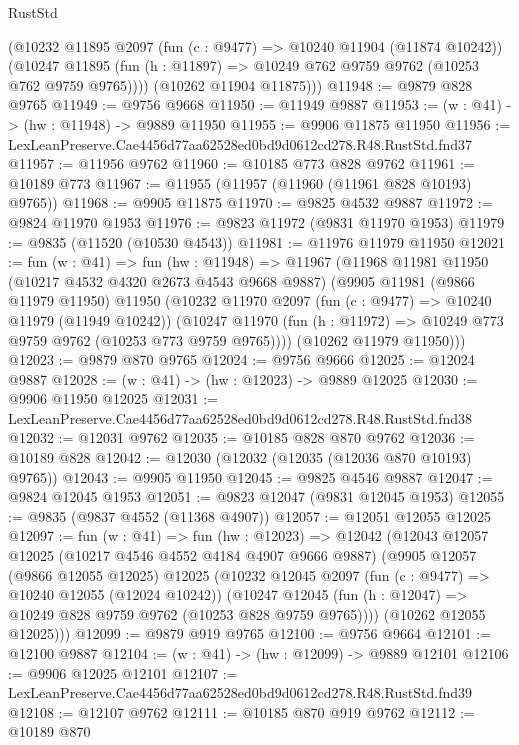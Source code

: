 \begin{lexlean}{RustStd}
\begin{coremodule}
        (@10232
          @11895
          @2097
          (fun (c : @9477) => @10240 @11904 (@11874 @10242))
          (@10247 @11895 (fun (h : @11897) => @10249 @762 @9759 @9762 (@10253 @762 @9759 @9765))))
        (@10262 @11904 @11875)))
@11948 := @9879 @828 @9765
@11949 := @9756 @9668
@11950 := @11949 @9887
@11953 := (w : @41) -> (hw : @11948) -> @9889 @11950
@11955 := @9906 @11875 @11950
@11956 := LexLeanPreserve.Cae4456d77aa62528ed0bd9d0612cd278.R48.RustStd.fnd37
@11957 := @11956 @9762
@11960 := @10185 @773 @828 @9762
@11961 := @10189 @773
@11967 := @11955 (@11957 (@11960 (@11961 @828 @10193) @9765))
@11968 := @9905 @11875
@11970 := @9825 @4532 @9887
@11972 := @9824 @11970 @1953
@11976 := @9823 @11972 (@9831 @11970 @1953)
@11979 := @9835 (@11520 (@10530 @4543))
@11981 := @11976 @11979 @11950
@12021 := fun (w : @41) =>
  fun (hw : @11948) =>
  @11967
    (@11968
      @11981
      @11950
      (@10217 @4532 @4320 @2673 @4543 @9668 @9887)
      (@9905
        @11981
        (@9866 @11979 @11950)
        @11950
        (@10232
          @11970
          @2097
          (fun (c : @9477) => @10240 @11979 (@11949 @10242))
          (@10247 @11970 (fun (h : @11972) => @10249 @773 @9759 @9762 (@10253 @773 @9759 @9765))))
        (@10262 @11979 @11950)))
@12023 := @9879 @870 @9765
@12024 := @9756 @9666
@12025 := @12024 @9887
@12028 := (w : @41) -> (hw : @12023) -> @9889 @12025
@12030 := @9906 @11950 @12025
@12031 := LexLeanPreserve.Cae4456d77aa62528ed0bd9d0612cd278.R48.RustStd.fnd38
@12032 := @12031 @9762
@12035 := @10185 @828 @870 @9762
@12036 := @10189 @828
@12042 := @12030 (@12032 (@12035 (@12036 @870 @10193) @9765))
@12043 := @9905 @11950
@12045 := @9825 @4546 @9887
@12047 := @9824 @12045 @1953
@12051 := @9823 @12047 (@9831 @12045 @1953)
@12055 := @9835 (@9837 @4552 (@11368 @4907))
@12057 := @12051 @12055 @12025
@12097 := fun (w : @41) =>
  fun (hw : @12023) =>
  @12042
    (@12043
      @12057
      @12025
      (@10217 @4546 @4552 @4184 @4907 @9666 @9887)
      (@9905
        @12057
        (@9866 @12055 @12025)
        @12025
        (@10232
          @12045
          @2097
          (fun (c : @9477) => @10240 @12055 (@12024 @10242))
          (@10247 @12045 (fun (h : @12047) => @10249 @828 @9759 @9762 (@10253 @828 @9759 @9765))))
        (@10262 @12055 @12025)))
@12099 := @9879 @919 @9765
@12100 := @9756 @9664
@12101 := @12100 @9887
@12104 := (w : @41) -> (hw : @12099) -> @9889 @12101
@12106 := @9906 @12025 @12101
@12107 := LexLeanPreserve.Cae4456d77aa62528ed0bd9d0612cd278.R48.RustStd.fnd39
@12108 := @12107 @9762
@12111 := @10185 @870 @919 @9762
@12112 := @10189 @870

\end{coremodule}
\end{lexlean}
